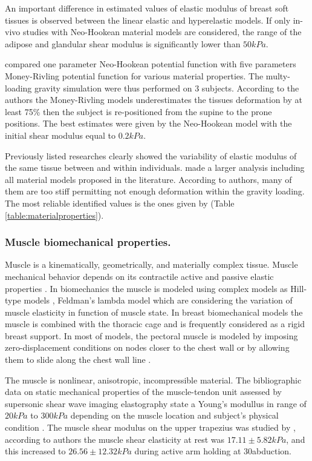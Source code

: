 An important difference in estimated values of elastic modulus of breast soft tissues is observed between the linear elastic and hyperelastic models. If only in-vivo studies with Neo-Hookean material models are considered, the range of the adipose and glandular shear modulus is significantly lower than $ 50kPa$. 

\cite{carter_biomechanical_2009} compared one parameter Neo-Hookean potential function with five parameters Money-Rivling potential function for various material properties. The multy-loading gravity simulation were thus performed on 3 subjects. According to the authors the Money-Rivling models underestimates the tissues deformation by at least 75\% then the subject is re-positioned from the supine to the prone positions. The best estimates were given by the Neo-Hookean model with the initial shear modulus equal to $0.2kPa$.  

Previously listed researches clearly showed the variability of elastic modulus of the same tissue between and within individuals. \cite{eder_comparison_2014} made a larger analysis including all material models proposed in the literature. According to authors, many of them are too stiff permitting not enough deformation within the gravity loading. The most reliable identified values is the ones given by \cite{rajagopal_creating_2008} (Table \ref{table:materialproperties}).

\subsubsection*{Muscle biomechanical properties.} 
Muscle is a kinematically, geometrically, and materially complex tissue. Muscle mechanical behavior depends on its contractile active and passive elastic properties \citep{nordez_muscle_2010}. In biomechanics the muscle is modeled using complex models as Hill-type models
\citep{zajac_muscle_1989}, Feldman’s lambda model \citep{feldman_once_1986} which are considering the variation of muscle elasticity in function of muscle state. In breast biomechanical models the muscle is combined with the thoracic cage and is frequently considered as a rigid breast support. In most of models, the pectoral muscle is modeled by imposing zero-displacement conditions on nodes closer to the chest wall \citep{abbas_biomechanical_2001,chung_modelling_2008,rajagopal_mapping_2010}  
or by allowing them to slide along the chest wall line \citep{han_nonlinear_2014,georgii_simulation_2016}.   

The muscle is nonlinear, anisotropic, incompressible material.  The bibliographic data on static mechanical properties of the muscle-tendon unit assessed by supersonic shear wave imaging elastography state a Young's modullus in range of $20kPa$ to $300kPa$  depending on the muscle location and subject's physical condition \citep{lima_eassessment_2018}.  The muscle shear modulus on the upper trapezius was studied by \cite{leong_quantitative_2013}, according to authors the muscle shear elasticity  at rest was $17.11\pm 5.82 kPa$, and this increased to $26.56\pm 12.32 kPa$ during active arm holding at 30\textdegree  abduction. 

